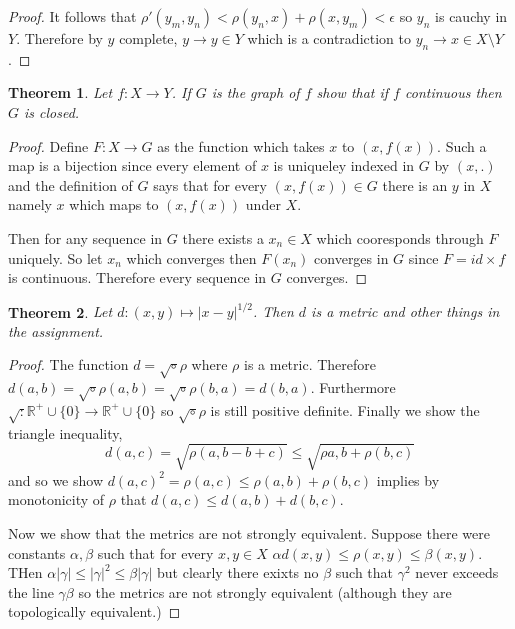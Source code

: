 \documentclass[letter]{article}
\newtheorem{theorem}{Theorem}
\newenvironment{menumerate}{%
  \edef\backupindent{\the\parindent}%
  \enumerate%
  \setlength{\parindent}{\backupindent}%
}{\endenumerate}
\begin{document}
\begin{menumerate}
\begin{proof}
			It follows that $\rho'(y_m, y_n) < \rho(y_n,x) + \rho(x, y_m) < \epsilon$ so $y_n$ is cauchy in $Y$. Therefore by $y$ complete, $y \to y \in Y$ which is a contradiction to $y_n \to x \in X \setminus Y$.
		\end{proof}
		\item
		\begin{theorem}
			Let $f: X \to Y$. If $G$ is the graph of $f$ show that if $f$ continuous then $G$ is closed.
		\end{theorem}
		\begin{proof}
			Define $F: X  \to G$ as the function which takes $x$ to $(x, f(x))$. Such a map is a bijection since every element of $x$ is uniqueley indexed in $G$ by $(x, .)$ and the definition of $G$ says that for every $(x, f(x)) \in G$ there is an $y$ in $X$ namely $x$ which maps to $(x, f(x))$ under $X$.

			Then for any sequence in $G$ there exists a $x_n \in X$ which cooresponds through $F$ uniquely. So let $x_n$ which converges then $F(x_n)$ converges in $G$ since $F = id \times f$ is continuous. Therefore every sequence in $G$ converges.
		\end{proof}
		\item
		\begin{theorem}
			Let $d: (x,y) \mapsto |x -y|^{1/2}$. Then $d$ is a metric and other things in the assignment.
		\end{theorem}
		\begin{proof}
			The function $d = \sqrt \circ \rho$ where $\rho$ is a metric. Therefore $d(a,b) = \sqrt \circ \rho(a,b) = \sqrt \circ \rho(b,a) = d(b,a).$ Furthermore $\sqrt: \mathbb{R}^+ \cup \{0\} \to \mathbb{R}^+ \cup \{0\}$ so $\sqrt \circ \rho$ is still positive definite. Finally we show the triangle inequality,
			\begin{equation}
				d(a,c) = \sqrt{\rho(a,b-b+c)} \leq \sqrt{\rho{a,b}+\rho(b,c)}
			\end{equation}
			and so we show 
			$d(a,c)^2 = \rho(a,c) \leq \rho(a,b) + \rho(b,c)$ implies by monotonicity of $\rho$ that $d(a,c) \leq d(a,b) + d(b,c).$

			Now we show that the metrics are not strongly equivalent. Suppose there were constants $\alpha, \beta$ such that for every $x,y \in X$ $\alpha d(x,y) \leq \rho(x,y) \leq \beta(x,y) $. THen $\alpha |\gamma| \leq |\gamma|^2 \leq \beta |\gamma|$ but clearly there exixts no $\beta$ such that $\gamma^2$ never exceeds the line $\gamma \beta$ so the metrics are not strongly equivalent (although they are topologically equivalent.)


\end{proof}
\end{menumerate}
\end{document}
